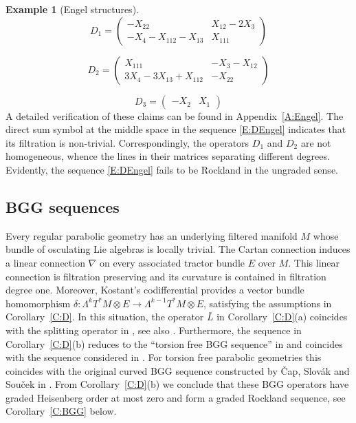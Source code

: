 \documentclass[reqno,12pt]{amsart}
\theoremstyle{plain}
\theoremstyle{definition}
\newtheorem{example}[theorem]{Example}
\begin{document}
\begin{example}[Engel structures]
$$
D_1=\left(\begin{array}{cc}-X_{22}&X_{12}-2X_3\\\hline-X_4-X_{112}-X_{13}&X_{111}\end{array}\right)
$$

$$
D_2=\left(\begin{array}{c|c}X_{111}&-X_3-X_{12}\\ 3X_4-3X_{13}+X_{112}&-X_{22}\end{array}\right)
$$

$$
D_3=\left(\begin{array}{cc}-X_2&X_1\end{array}\right)
$$
A detailed verification of these claims can be found in Appendix~\ref{A:Engel}.
The direct sum symbol at the middle space in the sequence \eqref{E:DEngel} indicates that its filtration is non-trivial.
Correspondingly, the operators $D_1$ and $D_2$ are not homogeneous, whence the lines in their matrices separating different degrees.
Evidently, the sequence \eqref{E:DEngel} fails to be Rockland in the ungraded sense.
\end{example}






\subsection{BGG sequences}\label{SS:BGG}





Every regular parabolic geometry has an underlying filtered manifold $M$ whose bundle of osculating Lie algebras is locally trivial.
The Cartan connection induces a linear connection $\nabla$ on every associated tractor bundle $E$ over $M$.
This linear connection is filtration preserving and its curvature is contained in filtration degree one.
Moreover, Kostant's codifferential provides a vector bundle homomorphism $\delta\colon\Lambda^kT^*M\otimes E\to\Lambda^{k-1}T^*M\otimes E$, satisfying the assumptions in Corollary~\ref{C:D}.
In this situation, the operator $\bar L$ in Corollary~\ref{C:D}(a) coincides with the splitting operator in \cite[Theorem~2.4]{CS12}, see also \cite{CSS01,CD01}.
Furthermore, the sequence in Corollary~\ref{C:D}(b) reduces to the  ``torsion free BGG sequence'' in \cite[Section~5]{CD01} and coincides with the sequence considered in \cite[Section~2.4]{CS12}.
For torsion free parabolic geometries this coincides with the original curved BGG sequence constructed by \v Cap, Slov\'ak and Sou\v cek in \cite{CSS01}.
From Corollary~\ref{C:D}(b) we conclude that these BGG operators have graded Heisenberg order at most zero and form a graded Rockland sequence, see Corollary~\ref{C:BGG} below.
\end{document}

